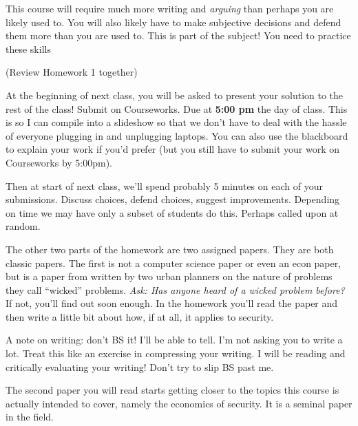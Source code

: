 \documentclass[11pt]{article}
\begin{document}
This course will require much more writing and {\it arguing} than perhaps you are likely used to.
You will also likely have to make subjective decisions and defend them more than you are used to. This is part of the subject! You need to practice these skills

(Review Homework 1 together)

At the beginning of next class, you will be asked to present your solution to the rest of the class! Submit on Courseworks. Due at {\bf 5:00 pm} the day of class. This is so I can compile into a slideshow so that we don't have to deal with the hassle of everyone plugging in and unplugging laptops. You can also use the blackboard to explain your work if you'd prefer (but you still have to submit your work on Courseworks by 5:00pm).

Then at start of next class, we'll spend probably 5 minutes on each of your submissions. Discuss choices, defend choices, suggest improvements. Depending on time we may have only a subset of students do this. Perhaps called upon at random. 

The other two parts of the homework are two assigned papers. They are both classic papers.
The first is not a computer science paper or even an econ paper, but is a paper from written by two urban planners on the nature of problems they call ``wicked'' problems. {\it Ask: Has anyone heard of a wicked problem before?} If not, you'll find out soon enough. In the homework you'll read the paper and then write a little bit about how, if at all, it applies to security. 

A note on writing: don't BS it! I'll be able to tell. I'm not asking you to write a lot. Treat this like an exercise in compressing your writing. I will be reading and critically evaluating your writing! Don't try to slip BS past me. 

The second paper you will read starts getting closer to the topics this course is actually intended to cover, namely the economics of security. It is a seminal paper in the field.
\end{document}
